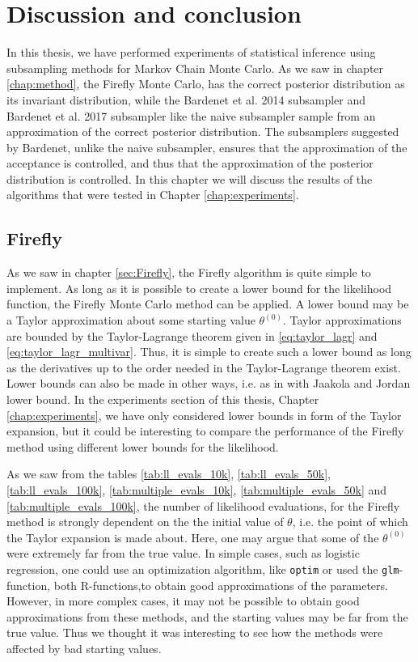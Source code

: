\chapter{Discussion and conclusion}
In this thesis, we have performed experiments of statistical inference using subsampling methods for Markov Chain Monte Carlo. As we saw in chapter \ref{chap:method}, the Firefly Monte Carlo, has the correct posterior distribution as its invariant distribution, while the Bardenet et al. 2014 subsampler and Bardenet et al. 2017 subsampler like the naive subsampler sample from an approximation of the correct posterior distribution. The subsamplers suggested by Bardenet, unlike the naive subsampler, ensures that the approximation of the acceptance is controlled, and thus that the approximation of the posterior distribution is controlled.  In this chapter we will discuss the results of the algorithms that were tested in Chapter \ref{chap:experiments}. 

\section{Firefly}
As we saw in chapter \ref{sec:Firefly}, the Firefly algorithm is quite simple to implement. As long as it is possible to create a lower bound for the likelihood function, the Firefly Monte Carlo method can be applied. A lower bound may be a Taylor approximation about some starting value $\theta^{\left(0\right)}$.  Taylor approximations are bounded by the Taylor-Lagrange theorem given in  \eqref{eq:taylor_lagr} and \eqref{eq:taylor_lagr_multivar}. Thus, it is simple to create such a lower bound as long as the derivatives up to the order needed in the Taylor-Lagrange theorem exist. Lower bounds can also be made in other ways, i.e. as in  \cite{Maclaurin:1} with Jaakola and Jordan lower bound. In the experiments section of this thesis, Chapter \ref{chap:experiments}, we have only considered lower bounds in form of the Taylor expansion, but it could be interesting to compare the performance of the Firefly method using different lower bounds for the likelihood.

As we saw from the tables \ref{tab:ll_evals_10k}, \ref{tab:ll_evals_50k}, \ref{tab:ll_evals_100k}, \ref{tab:multiple_evals_10k}, \ref{tab:multiple_evals_50k} and \ref{tab:multiple_evals_100k},  the number of  likelihood evaluations, for the Firefly method is strongly dependent on the the initial value of $\theta$, i.e. the point of which the Taylor expansion is made about.
Here, one may argue that some of the $\theta^{\left(0\right)}$ were extremely far from the true value. In simple cases, such as logistic regression, one could use an optimization algorithm, like \texttt{optim} or used the \texttt{glm}-function, both R-functions,to obtain good approximations of the parameters. 
However, in more complex cases, it may not be possible to obtain good approximations from these methods, and the starting values may be far from the true value. 
Thus we thought it was interesting to see how the methods were affected by bad starting values. 

